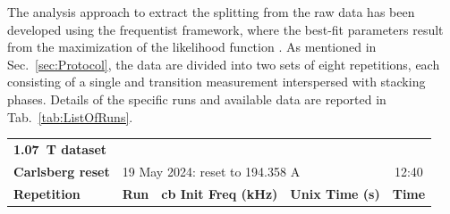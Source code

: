 The analysis approach to extract the splitting from the raw data has been developed using the frequentist framework, where the best-fit parameters result from the maximization of the likelihood function \likelihood. As mentioned in Sec.~\ref{sec:Protocol}, the data are divided into two sets of eight repetitions, each consisting of a single \cb and \da transition measurement interspersed with stacking phases. Details of the specific runs and available data are reported in Tab.~\ref{tab:ListOfRuns}. 

\begin{table}[!ht]
    \centering
    \begin{tabular}{l|cccc}
         \hline\hline
      {\bf \SI{1.07}{\tesla} dataset} & & & & \\
          {\bf Carlsberg reset}  & \multicolumn{3}{l}{19 May 2024: reset to 194.358 A} & 12:40     \\
    {\bf Repetition}   & {\bf Run}  & {\bf cb Init Freq (kHz)} & {\bf Unix Time (s)} & {\bf Time}  \\
          \hline


\end{tabular}
\end{table}

